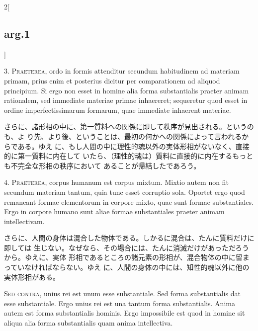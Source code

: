 \documentclass[paper=a4paper,fontsize=10pt,jafontsize=9pt,titlepage]{jlreq}
\begin{document}
\begin{paracol}{2}[\subsection{arg.1}]


3. {\scshape Praeterea}, ordo in formis attenditur secundum habitudinem ad
materiam primam, prius enim et posterius dicitur per comparationem ad aliquod
principium. Si ergo non esset in homine alia forma substantialis praeter animam
rationalem, sed immediate materiae primae inhaereret; sequeretur quod esset in
ordine imperfectissimarum formarum, quae immediate inhaerent materiae.

\switchcolumn

 さらに、諸形相の中に、第一質料への関係に即して秩序が見出される。というのも、よ
 り先、より後、ということは、最初の何かへの関係によって言われるからである。ゆえ
 に、もし人間の中に理性的魂以外の実体形相がないなく、直接的に第一質料に内在して
 いたら、（理性的魂は）質料に直接的に内在するもっとも不完全な形相の秩序において
 あることが帰結したであろう。

 


4. {\scshape Praeterea}, corpus humanum est corpus mixtum. Mixtio autem non fit
secundum materiam tantum, quia tunc esset corruptio sola. Oportet ergo quod
remaneant formae elementorum in corpore mixto, quae sunt formae
substantiales. Ergo in corpore humano sunt aliae formae substantiales praeter
animam intellectivam.

\switchcolumn

さらに、人間の身体は混合した物体である。しかるに混合は、たんに質料だけに即しては
生じない。なぜなら、その場合には、たんに消滅だけがあっただろうから。ゆえに、実体
形相であるところの諸元素の形相が、混合物体の中に留まっていなければならない。ゆえ
に、人間の身体の中には、知性的魂以外に他の実体形相がある。
 
\switchcolumn*[\subsection{s.c.}]


{\scshape Sed contra}, unius rei est unum esse substantiale. Sed forma
substantialis dat esse substantiale. Ergo unius rei est una tantum forma
substantialis. Anima autem est forma substantialis hominis. Ergo impossibile est
quod in homine sit aliqua alia forma substantialis quam anima intellectiva.


\end{paracol}
\end{document}
